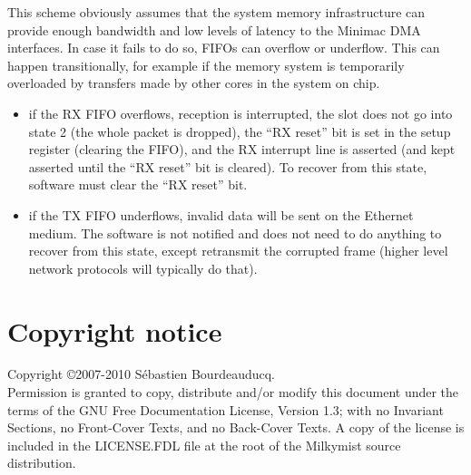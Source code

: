 \documentclass[a4paper,11pt]{article}
\begin{document}
This scheme obviously assumes that the system memory infrastructure can provide enough bandwidth and low levels of latency to the Minimac DMA interfaces. In case it fails to do so, FIFOs can overflow or underflow. This can happen transitionally, for example if the memory system is temporarily overloaded by transfers made by other cores in the system on chip.

\begin{itemize}
\item if the RX FIFO overflows, reception is interrupted, the slot does not go into state 2 (the whole packet is dropped), the ``RX reset'' bit is set in the setup register (clearing the FIFO), and the RX interrupt line is asserted (and kept asserted until the ``RX reset'' bit is cleared). To recover from this state, software must clear the ``RX reset'' bit.
\item if the TX FIFO underflows, invalid data will be sent on the Ethernet medium. The software is not notified and does not need to do anything to recover from this state, except retransmit the corrupted frame (higher level network protocols will typically do that).
\end{itemize}

\section*{Copyright notice}
Copyright \copyright 2007-2010 S\'ebastien Bourdeauducq. \\
Permission is granted to copy, distribute and/or modify this document under the terms of the GNU Free Documentation License, Version 1.3; with no Invariant Sections, no Front-Cover Texts, and no Back-Cover Texts. A copy of the license is included in the LICENSE.FDL file at the root of the Milkymist source distribution.
\end{document}
